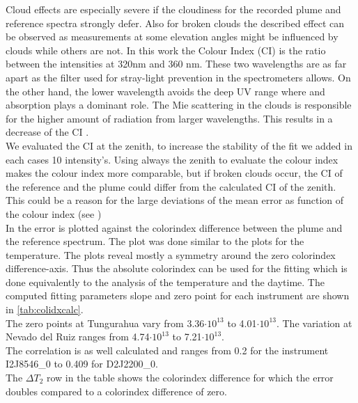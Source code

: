 Cloud effects are especially severe if the cloudiness for the recorded plume and reference spectra strongly defer. Also for broken clouds the described effect can be observed as measurements at some elevation angles might be influenced by clouds while others are not.
In this work the Colour Index (CI) is the ratio between the intensities at 320nm and 360 nm.
These two wavelengths are as far apart as the filter used for stray-light prevention in the spectrometers allows.
On the other hand, the lower wavelength avoids the deep UV range where  and   absorption plays a dominant role.
The Mie scattering in the clouds is responsible for the higher amount of radiation from larger wavelengths. This results in a decrease of the CI \citep{lubcke2014optical}.\\
We evaluated the CI at the zenith, to increase the stability of the fit we added in each cases 10 intensity's. Using always the zenith to evaluate the colour index makes the colour index more comparable, but if broken clouds occur, the CI of the reference and the plume could differ from the calculated CI of the zenith. This could be a reason for the large deviations of the mean  error as function of the colour index (see )\\
In  the  error is plotted against the colorindex difference between the plume and the reference spectrum. The plot was done similar to the plots for the temperature.
The plots reveal mostly a symmetry around the zero colorindex difference-axis. Thus the absolute colorindex can be used for the fitting which is done equivalently to the analysis of the temperature and the daytime. The computed fitting parameters slope and zero point for each instrument are shown in \cref{tab:colidxcalc}. \\
The zero points at Tungurahua vary from 3.36$\cdot10^{13}$ to 4.01$\cdot10^{13}$. The variation at Nevado del Ruiz ranges from  4.74$\cdot10^{13}$ to 7.21$\cdot10^{13}$.\\
The correlation is as well calculated and ranges from 0.2 for the instrument I2J8546\_0 to  0.409 for D2J2200\_0.\\
The $\Delta T_{2}$ row in the table shows the colorindex difference for which the error doubles compared to a colorindex difference of zero.

